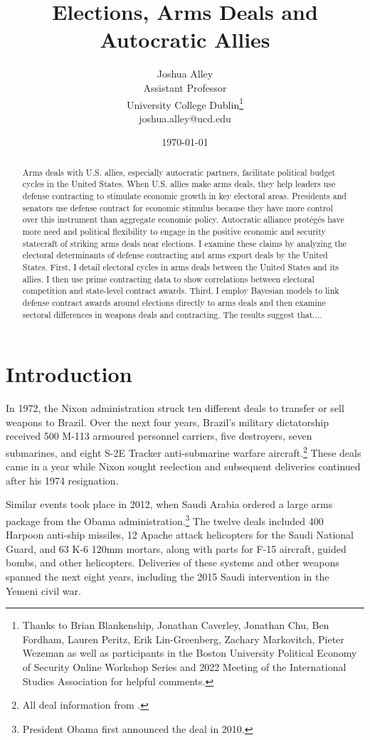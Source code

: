 \documentclass[12pt]{article}
\title{\textbf{Elections, Arms Deals and Autocratic Allies}}
\author{Joshua Alley \\
Assistant Professor \\
University College Dublin\thanks{Thanks to Brian Blankenship, Jonathan Caverley, Jonathan Chu, Ben Fordham, Lauren Peritz, Erik Lin-Greenberg, Zachary Markovitch, Pieter Wezeman as well as participants in the Boston University Political Economy of Security Online Workshop Series and 2022 Meeting of the International Studies Association for helpful comments.} \\
joshua.alley@ucd.edu
}
\date{\today}
\begin{document}
\maketitle 

\begin{abstract} 
Arms deals with U.S. allies, especially autocratic partners, facilitate political budget cycles in the United States. 
When U.S. allies make arms deals, they help leaders use defense contracting to stimulate economic growth in key electoral areas.
Presidents and senators use defense contract for economic stimulus because they have more control over this instrument than aggregate economic policy.
Autocratic alliance prot{\'e}g{\'e}s have more need and political flexibility to engage in the positive economic and security statecraft of striking arms deals near elections. 
I examine these claims by analyzing the electoral determinants of defense contracting and arms export deals by the United States. 
First, I  detail electoral cycles in arms deals between the United States and its allies. 
I then use prime contracting data to show correlations between electoral competition and state-level contract awards. 
Third, I employ Bayesian models to link defense contract awards around elections directly to arms deals and then examine sectoral differences in weapons deals and contracting.
The results suggest that.... 
\end{abstract} 


\newpage 
\doublespace 


\section{Introduction}



In 1972, the Nixon administration struck ten different deals to transfer or sell weapons to Brazil.
Over the next four years, Brazil's military dictatorship received 500 M-113 armoured personnel carriers, five destroyers, seven submarines, and eight S-2E Tracker anti-submarine warfare aircraft.\footnote{All deal information from \citep{Sipri2022}.}
These deals came in a year while Nixon sought reelection and subsequent deliveries continued after his 1974 resignation. 


Similar events took place in 2012, when Saudi Arabia ordered a large arms package from the Obama administration.\footnote{President Obama first announced the deal in 2010.} 
The twelve deals included 400 Harpoon anti-ship missiles, 12 Apache attack helicopters for the Saudi National Guard, and 63 K-6 120mm mortars, along with parts for F-15 aircraft, guided bombs, and other helicopters. 
Deliveries of these systems and other weapons spanned the next eight years, including the 2015 Saudi intervention in the Yemeni civil war. 
\end{document}
